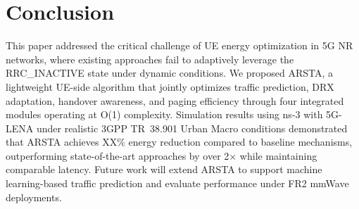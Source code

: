 \documentclass[conference]{IEEEtran}
\begin{document}
\section{Conclusion}
\label{sec:conclusion}

This paper addressed the critical challenge of UE energy optimization in 5G NR networks, where existing approaches fail to adaptively leverage the RRC\_INACTIVE state under dynamic conditions. We proposed ARSTA, a lightweight UE-side algorithm that jointly optimizes traffic prediction, DRX adaptation, handover awareness, and paging efficiency through four integrated modules operating at O(1) complexity. Simulation results using ns-3 with 5G-LENA under realistic 3GPP TR~38.901 Urban Macro conditions demonstrated that ARSTA achieves XX\% energy reduction compared to baseline mechanisms, outperforming state-of-the-art approaches by over 2$\times$ while maintaining comparable latency. Future work will extend ARSTA to support machine learning-based traffic prediction and evaluate performance under FR2 mmWave deployments.


\balance


\end{document}

